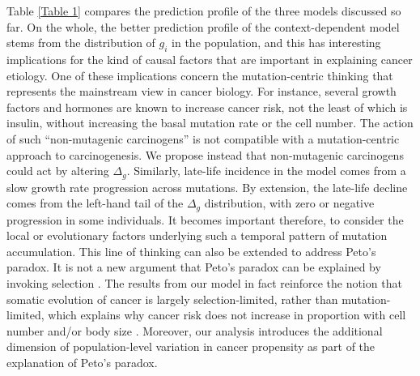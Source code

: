 \documentclass[9pt,twocolumn,twoside]{pnas-new}
\begin{document}
Table \ref{Table 1} compares the prediction profile of the three models discussed so far. On the whole, the better prediction profile of the context-dependent model stems from the distribution of $g_{i}$ in the population, and this has interesting implications for the kind of causal factors that are important in explaining cancer etiology. One of these implications concern the mutation-centric thinking that represents the mainstream view in cancer biology. For instance, several growth factors and hormones are known to increase cancer risk, not the least of which is insulin, without increasing the basal mutation rate or the cell number. The action of such ``non-mutagenic carcinogens'' is not compatible with a mutation-centric approach to carcinogenesis. We propose instead that non-mutagenic carcinogens could act by altering $\Delta_{g}$.
Similarly, late-life incidence in the model comes from a slow growth rate progression across mutations. By extension, the late-life decline comes from the left-hand tail of the $\Delta_{g}$ distribution, with zero or negative progression in some individuals. It becomes important therefore, to consider the local or evolutionary factors underlying such a temporal pattern of mutation accumulation.
This line of thinking can also be extended to address Peto's paradox. It is not a new argument that Peto's paradox can be explained by invoking selection \cite{Caulin2011,Noble2015,Tollis2017b}. The results from our model in fact reinforce the notion that somatic evolution of cancer is largely selection-limited, rather than mutation-limited, which explains why cancer risk does not increase in proportion with cell number and/or body size \cite{Nagy2007}. Moreover, our analysis introduces the additional dimension of population-level variation in cancer propensity as part of the explanation of Peto's paradox.
\end{document}
